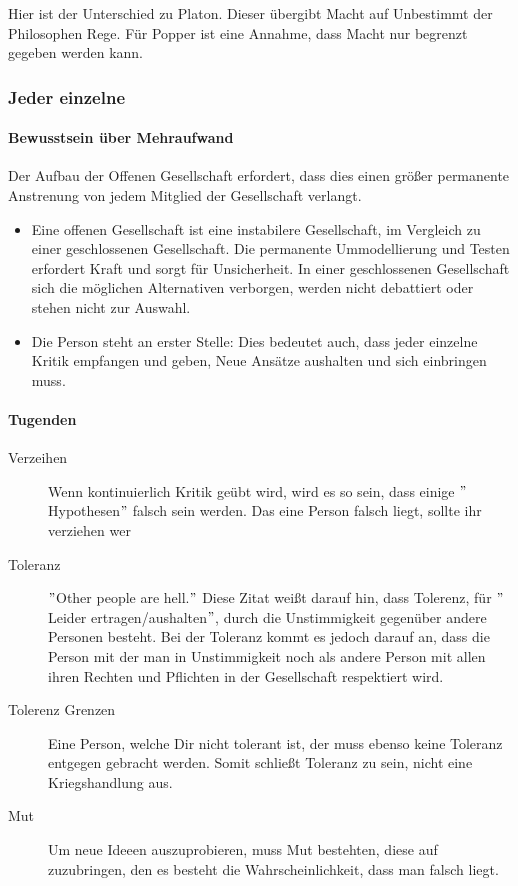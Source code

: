 Hier ist der Unterschied zu Platon. Dieser übergibt Macht auf Unbestimmt der Philosophen Rege. Für Popper ist eine Annahme, dass Macht nur begrenzt gegeben werden kann.

\subsubsection{Jeder einzelne}
\paragraph{Bewusstsein über Mehraufwand}
Der Aufbau der Offenen Gesellschaft erfordert, dass dies einen größer permanente Anstrenung von jedem Mitglied der Gesellschaft verlangt.

\begin{itemize}
	\item Eine offenen Gesellschaft ist eine instabilere Gesellschaft, im Vergleich zu einer geschlossenen Gesellschaft. Die permanente Ummodellierung und Testen erfordert Kraft und sorgt für Unsicherheit. In einer geschlossenen Gesellschaft sich die möglichen Alternativen verborgen, werden nicht debattiert oder stehen nicht zur Auswahl.
	\item Die Person steht an erster Stelle: Dies bedeutet auch, dass jeder einzelne Kritik empfangen und geben, Neue Ansätze aushalten und sich einbringen muss.
\end{itemize}

\paragraph{Tugenden}
\begin{description}
	\item[Verzeihen] Wenn kontinuierlich Kritik geübt wird, wird es so sein, dass einige $"$Hypothesen$"$ falsch sein werden. Das eine Person falsch liegt, sollte ihr verziehen wer	
	\item[Toleranz] $"$Other people are hell.$"$ Diese Zitat weißt darauf hin, dass Tolerenz, für $"$Leider ertragen/aushalten$"$, durch die Unstimmigkeit gegenüber andere Personen besteht. Bei der Toleranz kommt es jedoch darauf an, dass die Person mit der man in Unstimmigkeit noch als andere Person mit allen ihren Rechten und Pflichten in der Gesellschaft respektiert wird.
	\item[Tolerenz Grenzen] Eine Person, welche Dir nicht tolerant ist, der muss ebenso keine Toleranz entgegen gebracht werden. Somit schließt Toleranz zu sein, nicht eine Kriegshandlung aus.
	\item[Mut] Um neue Ideeen auszuprobieren, muss Mut bestehten, diese auf zuzubringen, den es besteht die Wahrscheinlichkeit, dass man falsch liegt.
\end{description}


